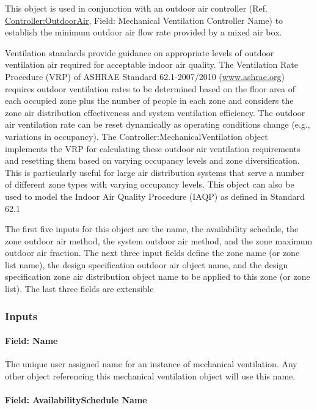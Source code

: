 This object is used in conjunction with an outdoor air controller (Ref. \hyperref[controlleroutdoorair]{Controller:OutdoorAir}, Field: Mechanical Ventilation Controller Name) to establish the minimum outdoor air flow rate provided by a mixed air box.

Ventilation standards provide guidance on appropriate levels of outdoor ventilation air required for acceptable indoor air quality. The Ventilation Rate Procedure (VRP) of ASHRAE Standard 62.1-2007/2010 (\href{http://www.ashrae.org}{www.ashrae.org}) requires outdoor ventilation rates to be determined based on the floor area of each occupied zone plus the number of people in each zone and considers the zone air distribution effectiveness and system ventilation efficiency. The outdoor air ventilation rate can be reset dynamically as operating conditions change (e.g., variations in occupancy). The Controller:MechanicalVentilation object implements the VRP for calculating these outdoor air ventilation requirements and resetting them based on varying occupancy levels and zone diversification. This is particularly useful for large air distribution systems that serve a number of different zone types with varying occupancy levels. This object can also be used to model the Indoor Air Quality Procedure (IAQP) as defined in Standard 62.1

The first five inputs for this object are the name, the availability schedule, the zone outdoor air method, the system outdoor air method, and the zone maximum outdoor air fraction. The next three input fields define the zone name (or zone list name), the design specification outdoor air object name, and the design specification zone air distribution object name to be applied to this zone (or zone list). The last three fields are extensible

\subsubsection{Inputs}\label{inputs-2-007}

\paragraph{Field: Name}\label{field-name-2-006}

The unique user assigned name for an instance of mechanical ventilation. Any other object referencing this mechanical ventilation object will use this name.

\paragraph{Field: AvailabilitySchedule Name}\label{field-availabilityschedule-name}

